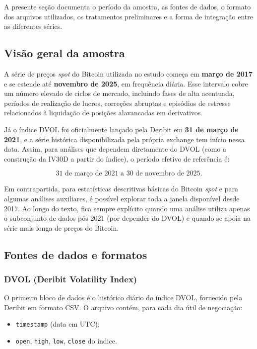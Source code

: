 A presente seção documenta o período da amostra, as fontes de dados, o formato
dos arquivos utilizados, os tratamentos preliminares e a forma de integração entre
as diferentes séries.

\subsection{Visão geral da amostra}

A série de preços \textit{spot} do Bitcoin utilizada no estudo começa em
\textbf{março de 2017} e se estende até \textbf{novembro de 2025}, em frequência diária.
Esse intervalo cobre um número elevado de ciclos de mercado, incluindo fases de
alta acentuada, períodos de realização de lucros, correções abruptas e episódios de
estresse relacionados à liquidação de posições alavancadas em derivativos.

Já o índice DVOL foi oficialmente lançado pela Deribit em
\textbf{31 de março de 2021}, e a série histórica disponibilizada pela própria exchange
tem início nessa data. Assim, para análises que dependem diretamente do DVOL
(como a construção da IV30D a partir do índice), o período efetivo de referência é:

\[
\text{31 de março de 2021 a 30 de novembro de 2025}.
\]

Em contrapartida, para estatísticas descritivas básicas do Bitcoin \textit{spot} e para
algumas análises auxiliares, é possível explorar toda a janela disponível desde 2017.
Ao longo do texto, fica sempre explícito quando uma análise utiliza apenas o
subconjunto de dados pós-2021 (por depender do DVOL) e quando se apoia na
série mais longa de preços do Bitcoin.

\subsection{Fontes de dados e formatos}

\subsubsection*{DVOL (Deribit Volatility Index)}

O primeiro bloco de dados é o histórico diário do índice DVOL, fornecido pela
Deribit em formato CSV. O arquivo contém, para cada dia útil de negociação:

\begin{itemize}
    \item \texttt{timestamp} (data em UTC);
    \item \texttt{open}, \texttt{high}, \texttt{low}, \texttt{close} do índice.
\end{itemize}

